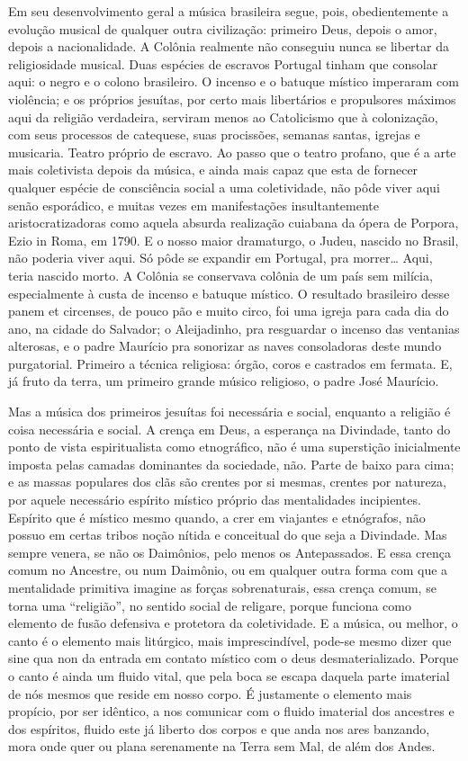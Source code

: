Em seu desenvolvimento geral a música brasileira segue, pois,
obedientemente a evolução musical de qualquer outra civilização:
primeiro Deus, depois o amor, depois a nacionalidade. A Colônia
realmente não conseguiu nunca se libertar da religiosidade musical. Duas
espécies de escravos Portugal tinham que consolar aqui: o negro e o
colono brasileiro. O incenso e o batuque místico imperaram com
violência; e os próprios jesuítas, por certo mais libertários e
propulsores máximos aqui da religião verdadeira, serviram menos ao
Catolicismo que à colonização, com seus processos de catequese, suas
procissões, semanas santas, igrejas e musicaria. Teatro próprio de
escravo. Ao passo que o teatro profano, que é a arte mais coletivista
depois da música, e ainda mais capaz que esta de fornecer qualquer
espécie de consciência social a uma coletividade, não pôde viver aqui
senão esporádico, e muitas vezes em manifestações insultantemente
aristocratizadoras como aquela absurda realização cuiabana da ópera de
Porpora, Ezio in Roma, em 1790. E o nosso maior dramaturgo, o Judeu,
nascido no Brasil, não poderia viver aqui. Só pôde se expandir em
Portugal, pra morrer\ldots{} Aqui, teria nascido morto. A Colônia se
conservava colônia de um país sem milícia, especialmente à custa de
incenso e batuque místico. O resultado brasileiro desse panem et
circenses, de pouco pão e muito circo, foi uma igreja para cada dia do
ano, na cidade do Salvador; o Aleijadinho, pra resguardar o incenso das
ventanias alterosas, e o padre Maurício pra sonorizar as naves
consoladoras deste mundo purgatorial. Primeiro a técnica religiosa:
órgão, coros e castrados em fermata. E, já fruto da terra, um primeiro
grande músico religioso, o padre José Maurício.

Mas a música dos primeiros jesuítas foi necessária e social, enquanto a
religião é coisa necessária e social. A crença em Deus, a esperança na
Divindade, tanto do ponto de vista espiritualista como etnográfico, não
é uma superstição inicialmente imposta pelas camadas dominantes da
sociedade, não. Parte de baixo para cima; e as massas populares dos clãs
são crentes por si mesmas, crentes por natureza, por aquele necessário
espírito místico próprio das mentalidades incipientes. Espírito que é
místico mesmo quando, a crer em viajantes e etnógrafos, não possuo em
certas tribos noção nítida e conceitual do que seja a Divindade. Mas
sempre venera, se não os Daimônios, pelo menos os Antepassados. E essa
crença comum no Ancestre, ou num Daimônio, ou em qualquer outra forma
com que a mentalidade primitiva imagine as forças sobrenaturais, essa
crença comum, se torna uma ``religião'', no sentido social de religare,
porque funciona como elemento de fusão defensiva e protetora da
coletividade. E a música, ou melhor, o canto é o elemento mais
litúrgico, mais imprescindível, pode-se mesmo dizer que sine qua non da
entrada em contato místico com o deus desmaterializado. Porque o canto é
ainda um fluido vital, que pela boca se escapa daquela parte imaterial
de nós mesmos que reside em nosso corpo. É justamente o elemento mais
propício, por ser idêntico, a nos comunicar com o fluido imaterial dos
ancestres e dos espíritos, fluido este já liberto dos corpos e que anda
nos ares banzando, mora onde quer ou plana serenamente na Terra sem Mal,
de além dos Andes.

